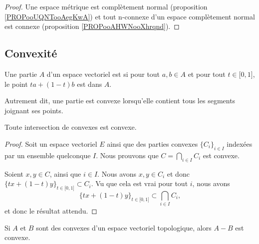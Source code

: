 \begin{proof}
	Une espace métrique est complètement normal (proposition \ref{PROPooUQNTooAegKwA}) et tout n-connexe d'un espace complètement normal est connexe (proposition \ref{PROPooAHWNooXhrqnd}).
\end{proof}

\subsection{Convexité}

\begin{definition}        \label{DEFooQQEOooAFKbcQ}
	Une partie \( A\) d'un espace vectoriel est  si pour tout \( a,b\in A\) et pour tout \( t\in \mathopen[ 0 , 1 \mathclose]\), le point \( ta+(1-t)b\) est dans \( A\).

	Autrement dit, une partie est convexe lorsqu'elle contient tous les segments joignant ses points.
\end{definition}

\begin{proposition} \label{PROPooJOCEooUKhkqQ}
	Toute intersection de convexes est convexe.
\end{proposition}

\begin{proof}
	Soit un espace vectoriel \( E\) ainsi que des parties convexes \( \{  C_i \}_{i\in I}\) indexées par un ensemble quelconque \( I\). Nous prouvons que \( C= \bigcap_{i\in I}C_i\) est convexe.

	Soient \( x, y\in C\), ainsi que \( i\in I\). Nous avons \( x,y\in C_i\) et donc \( \{ tx+(1-t)y \}_{t\in \mathopen[ 0 , 1 \mathclose]}\subset C_i\). Vu que cela est vrai pour tout \( i\), nous avons
	\begin{equation}
		\{ tx+(1-t)y \}_{t\in \mathopen[ 0 , 1 \mathclose]}\subset \bigcap_{i\in I}C_i,
	\end{equation}
	et donc le résultat attendu.
\end{proof}


\begin{proposition}	\label{PROPooJOXUooEZELna}
	Si \( A\) et \( B\) sont des convexes d'un espace vectoriel topologique, alors \( A-B\) est convexe.
\end{proposition}

